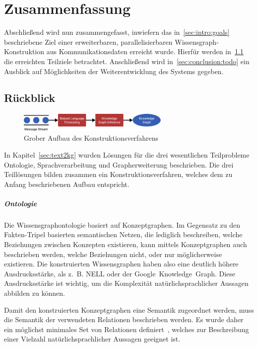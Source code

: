 \chapter{Zusammenfassung}%
\label{sec:conclusion}

Abschließend wird nun zusammengefasst, inwiefern das in~\ref{sec:intro:goals} beschriebene Ziel einer erweiterbaren, parallelisierbaren Wissensgraph-Konstruktion aus Kommunikationsdaten erreicht wurde.
Hierfür werden in~\ref{sec:conclusion:review} die erreichten Teilziele betrachtet.
Anschließend wird in~\ref{sec:conclusion:todo} ein Ausblick auf Möglichkeiten der Weiterentwicklung des Systems gegeben.

\section{Rückblick}%
\label{sec:conclusion:review}

\begin{figure}[h]
	\centering
	\includegraphics[width=0.65\textwidth]{gfx/conclusion/overview.pdf}
	\caption{Grober Aufbau des Konstruktionsverfahrens}\label{fig:conclusion:overview}
\end{figure}
In Kapitel~\ref{sec:text2kg} wurden Lösungen für die drei wesentlichen Teilprobleme Ontologie, Sprachverarbeitung und Grapherweiterung beschrieben.
Die drei Teillösungen bilden zusammen ein Konstruktionsverfahren, welches dem zu Anfang beschriebenen Aufbau entspricht.

\paragraph{Ontologie}
Die Wissensgraphontologie basiert auf Konzeptgraphen.
Im Gegensatz zu den Fakten-Tripel basierten semantischen Netzen, die lediglich beschreiben, welche Beziehungen zwischen Konzepten existieren, kann mittels Konzeptgraphen auch beschrieben werden, welche Beziehungen nicht, oder nur möglicherweise existieren.
Die konstruierten Wissensgraphen haben also eine deutlich höhere Ausdrucksstärke, als z.~B. NELL oder der Google~Knowledge~Graph.
Diese Ausdrucksstärke ist wichtig, um die Komplexität natürlichsprachlicher Aussagen abbilden zu können.

Damit den konstruierten Konzeptgraphen eine Semantik zugeordnet werden, muss die Semantik der verwendeten Relationen beschrieben werden.
Es wurde daher ein möglichst minimales Set von Relationen definiert~, welches zur Beschreibung einer Vielzahl natürlichsprachlicher Aussagen geeignet ist.

